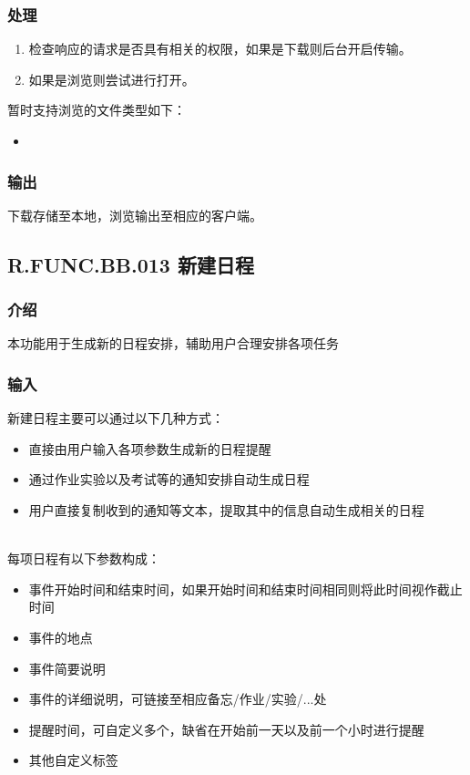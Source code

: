     \subsubsection{处理}
    \begin{enumerate}
      \item 检查响应的请求是否具有相关的权限，如果是下载则后台开启传输。
      \item 如果是浏览则尝试进行打开。
    \end{enumerate}
    暂时支持浏览的文件类型如下：
    \begin{itemize}
      \item
    \end{itemize}
    \subsubsection{输出}
    下载存储至本地，浏览输出至相应的客户端。

  \subsection{R.FUNC.BB.013 新建日程}
    \subsubsection{介绍}
    本功能用于生成新的日程安排，辅助用户合理安排各项任务
    \subsubsection{输入}
    新建日程主要可以通过以下几种方式：
    \begin{itemize}
      \item 直接由用户输入各项参数生成新的日程提醒
      \item 通过作业实验以及考试等的通知安排自动生成日程
      \item 用户直接复制收到的通知等文本，提取其中的信息自动生成相关的日程
    \end{itemize}\\
    每项日程有以下参数构成：
    \begin{itemize}
      \item 事件开始时间和结束时间，如果开始时间和结束时间相同则将此时间视作截止时间
      \item 事件的地点
      \item 事件简要说明
      \item 事件的详细说明，可链接至相应备忘/作业/实验/...处
      \item 提醒时间，可自定义多个，缺省在开始前一天以及前一个小时进行提醒
      \item 其他自定义标签
    \end{itemize}
